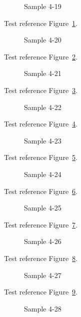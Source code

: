 \begin{figure}[tbhp]
\caption{Sample 4-19}
\label{fig:sample-4-19}
\end{figure}

Test reference Figure~\ref{fig:sample-4-19}.

\begin{figure}[tbhp]
\caption{Sample 4-20}
\label{fig:sample-4-20}
\end{figure}

Test reference Figure~\ref{fig:sample-4-20}.

\begin{figure}[tbhp]
\caption{Sample 4-21}
\label{fig:sample-4-21}
\end{figure}

Test reference Figure~\ref{fig:sample-4-21}.

\begin{figure}[tbhp]
\caption{Sample 4-22}
\label{fig:sample-4-22}
\end{figure}

Test reference Figure~\ref{fig:sample-4-22}.

\begin{figure}[tbhp]
\caption{Sample 4-23}
\label{fig:sample-4-23}
\end{figure}

Test reference Figure~\ref{fig:sample-4-23}.

\begin{figure}[tbhp]
\caption{Sample 4-24}
\label{fig:sample-4-24}
\end{figure}

Test reference Figure~\ref{fig:sample-4-24}.

\begin{figure}[tbhp]
\caption{Sample 4-25}
\label{fig:sample-4-25}
\end{figure}

Test reference Figure~\ref{fig:sample-4-25}.

\begin{figure}[tbhp]
\caption{Sample 4-26}
\label{fig:sample-4-26}
\end{figure}

Test reference Figure~\ref{fig:sample-4-26}.

\begin{figure}[tbhp]
\caption{Sample 4-27}
\label{fig:sample-4-27}
\end{figure}

Test reference Figure~\ref{fig:sample-4-27}.

\begin{figure}[tbhp]
\caption{Sample 4-28}
\label{fig:sample-4-28}
\end{figure}

